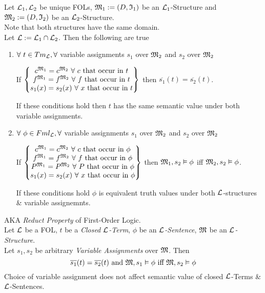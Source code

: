 \documentclass[11pt,a4paper]{article}
\begin{document}
Let $\mathcal{L}_1,\mathcal{L}_2$ be unique FOLs, $\mathfrak{M}_1:=(D,\mathfrak{I}_1)$ be an $\mathcal{L}_1$-Structure and $\mathfrak{M}_2:=(D,\mathfrak{I}_2)$ be an $\mathcal{L}_2$-Structure.\\
Note that both structures have the same domain.\\
Let $\mathcal{L}:=\mathcal{L}_1\cap\mathcal{L}_2$. Then the following are true
\begin{enumerate}
	\item $\forall\ t\in Tm_{\mathcal{L}}, \forall$ variable assignments $s_1$ over $\mathfrak{M}_2$ and $s_2$ over $\mathfrak{M}_2$
	\begin{center}
	If $\begin{Bmatrix}c^{\M_1}=c^{\M_2}\ \forall\ c\text{ that occur in }t\\f^{\M_1}=f^{\M_2}\ \forall\ f\text{ that occur in }t\\s_1(x)=s_2(x)\ \forall\ x\text{ that occur in }t\end{Bmatrix}$ then $\overline{s_1}(t)=\overline{s_2}(t)$.
	\end{center}
	\ie If these conditions hold then $t$ has the same semantic value under both variable assignments.
	\item $\forall\ \phi\in Fml_{\mathcal{L}}, \forall$ variable assignments $s_1$ over $\mathfrak{M}_2$ and $s_2$ over $\mathfrak{M}_2$
	\begin{center}
	If $\begin{Bmatrix}c^{\M_1}=c^{\M_2}\ \forall\ c\text{ that occur in }\phi\\f^{\M_1}=f^{\M_2}\ \forall\ f\text{ that occur in }\phi\\P^{\M_1}=P^{\M_2}\ \forall\ P\text{ that occur in }\phi\\s_1(x)=s_2(x)\ \forall\ x\text{ that occur in }\phi\end{Bmatrix}$ then $\mathfrak{M}_1,s_2\vDash\phi$ iff $\mathfrak{M}_2,s_2\vDash \phi$.
	\end{center}
	\ie If these conditions hold $\phi$ is equivalent truth values under both $\mathcal{L}$-structures \& variable assignemnts.
\end{enumerate}
\nb AKA \textit{Reduct Property} of First-Order Logic.\\

Let $\mathcal{L}$ be a FOL, $t$ be a \textit{Closed $\mathcal{L}$-Term}, $\phi$ be an \textit{$\mathcal{L}$-Sentence}, $\mathfrak{M}$ be an \textit{$\mathcal{L}$-Structure}.\\
Let $s_1,s_2$ be arbitrary \textit{Variable Assignments} over $\mathfrak{M}$. Then
$$\overline{s_1}(t)=\overline{s_2}(t)\text{ and }\mathfrak{M},s_1\vDash\phi\text{ iff }\mathfrak{M},s_2\vDash\phi$$
\ie Choice of variable assignment does not affect semantic value of closed $\mathcal{L}$-Terms \& $\mathcal{L}$-Sentences.\\
\end{document}
